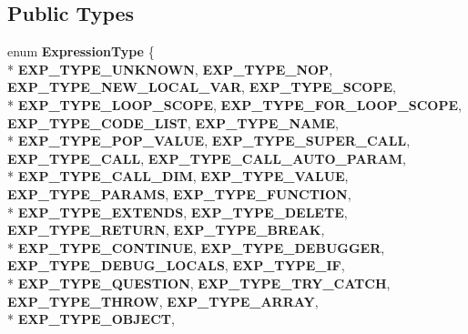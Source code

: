 \subsection*{Public Types}
\begin{DoxyCompactItemize}
\item 
enum {\bfseries Expression\+Type} \{ \\*
{\bfseries E\+X\+P\+\_\+\+T\+Y\+P\+E\+\_\+\+U\+N\+K\+N\+O\+WN}, 
{\bfseries E\+X\+P\+\_\+\+T\+Y\+P\+E\+\_\+\+N\+OP}, 
{\bfseries E\+X\+P\+\_\+\+T\+Y\+P\+E\+\_\+\+N\+E\+W\+\_\+\+L\+O\+C\+A\+L\+\_\+\+V\+AR}, 
{\bfseries E\+X\+P\+\_\+\+T\+Y\+P\+E\+\_\+\+S\+C\+O\+PE}, 
\\*
{\bfseries E\+X\+P\+\_\+\+T\+Y\+P\+E\+\_\+\+L\+O\+O\+P\+\_\+\+S\+C\+O\+PE}, 
{\bfseries E\+X\+P\+\_\+\+T\+Y\+P\+E\+\_\+\+F\+O\+R\+\_\+\+L\+O\+O\+P\+\_\+\+S\+C\+O\+PE}, 
{\bfseries E\+X\+P\+\_\+\+T\+Y\+P\+E\+\_\+\+C\+O\+D\+E\+\_\+\+L\+I\+ST}, 
{\bfseries E\+X\+P\+\_\+\+T\+Y\+P\+E\+\_\+\+N\+A\+ME}, 
\\*
{\bfseries E\+X\+P\+\_\+\+T\+Y\+P\+E\+\_\+\+P\+O\+P\+\_\+\+V\+A\+L\+UE}, 
{\bfseries E\+X\+P\+\_\+\+T\+Y\+P\+E\+\_\+\+S\+U\+P\+E\+R\+\_\+\+C\+A\+LL}, 
{\bfseries E\+X\+P\+\_\+\+T\+Y\+P\+E\+\_\+\+C\+A\+LL}, 
{\bfseries E\+X\+P\+\_\+\+T\+Y\+P\+E\+\_\+\+C\+A\+L\+L\+\_\+\+A\+U\+T\+O\+\_\+\+P\+A\+R\+AM}, 
\\*
{\bfseries E\+X\+P\+\_\+\+T\+Y\+P\+E\+\_\+\+C\+A\+L\+L\+\_\+\+D\+IM}, 
{\bfseries E\+X\+P\+\_\+\+T\+Y\+P\+E\+\_\+\+V\+A\+L\+UE}, 
{\bfseries E\+X\+P\+\_\+\+T\+Y\+P\+E\+\_\+\+P\+A\+R\+A\+MS}, 
{\bfseries E\+X\+P\+\_\+\+T\+Y\+P\+E\+\_\+\+F\+U\+N\+C\+T\+I\+ON}, 
\\*
{\bfseries E\+X\+P\+\_\+\+T\+Y\+P\+E\+\_\+\+E\+X\+T\+E\+N\+DS}, 
{\bfseries E\+X\+P\+\_\+\+T\+Y\+P\+E\+\_\+\+D\+E\+L\+E\+TE}, 
{\bfseries E\+X\+P\+\_\+\+T\+Y\+P\+E\+\_\+\+R\+E\+T\+U\+RN}, 
{\bfseries E\+X\+P\+\_\+\+T\+Y\+P\+E\+\_\+\+B\+R\+E\+AK}, 
\\*
{\bfseries E\+X\+P\+\_\+\+T\+Y\+P\+E\+\_\+\+C\+O\+N\+T\+I\+N\+UE}, 
{\bfseries E\+X\+P\+\_\+\+T\+Y\+P\+E\+\_\+\+D\+E\+B\+U\+G\+G\+ER}, 
{\bfseries E\+X\+P\+\_\+\+T\+Y\+P\+E\+\_\+\+D\+E\+B\+U\+G\+\_\+\+L\+O\+C\+A\+LS}, 
{\bfseries E\+X\+P\+\_\+\+T\+Y\+P\+E\+\_\+\+IF}, 
\\*
{\bfseries E\+X\+P\+\_\+\+T\+Y\+P\+E\+\_\+\+Q\+U\+E\+S\+T\+I\+ON}, 
{\bfseries E\+X\+P\+\_\+\+T\+Y\+P\+E\+\_\+\+T\+R\+Y\+\_\+\+C\+A\+T\+CH}, 
{\bfseries E\+X\+P\+\_\+\+T\+Y\+P\+E\+\_\+\+T\+H\+R\+OW}, 
{\bfseries E\+X\+P\+\_\+\+T\+Y\+P\+E\+\_\+\+A\+R\+R\+AY}, 
\\*
{\bfseries E\+X\+P\+\_\+\+T\+Y\+P\+E\+\_\+\+O\+B\+J\+E\+CT}, 

\end{DoxyCompactItemize}
